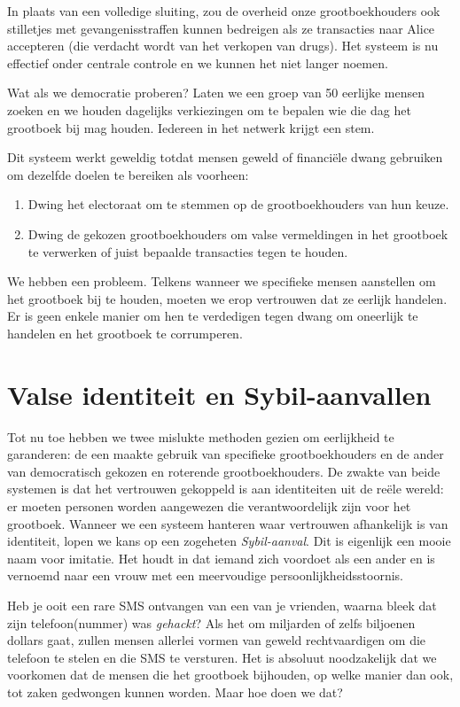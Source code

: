 \documentclass[smalldemyvopaper,11pt,twoside,onecolumn,openright,extrafontsizes]{memoir}
\begin{document}
In plaats van een volledige sluiting, zou de overheid onze grootboekhouders ook stilletjes met gevangenisstraffen kunnen bedreigen als ze transacties naar Alice accepteren (die verdacht wordt van het verkopen van drugs). Het systeem is nu effectief onder centrale controle en we kunnen het niet langer  noemen. 

Wat als we democratie proberen? Laten we een groep van 50 eerlijke mensen zoeken en we houden dagelijks verkiezingen om te bepalen wie die dag het grootboek bij mag houden. Iedereen in het netwerk krijgt een stem.

Dit systeem werkt geweldig totdat mensen geweld of financiële dwang gebruiken om dezelfde doelen te bereiken als voorheen:

\begin{enumerate}
    \item Dwing het electoraat om te stemmen op de grootboekhouders van hun keuze.
    \item Dwing de gekozen grootboekhouders om valse vermeldingen in het grootboek te verwerken of juist bepaalde transacties tegen te houden.
\end{enumerate}

We hebben een probleem. Telkens wanneer we specifieke mensen aanstellen om het grootboek bij te houden, moeten we erop vertrouwen dat ze eerlijk handelen. Er is geen enkele manier om hen te verdedigen tegen dwang om oneerlijk te handelen en het grootboek te corrumperen.

\section{Valse identiteit en Sybil-aanvallen}

Tot nu toe hebben we twee mislukte methoden gezien om eerlijkheid te garanderen: de een maakte gebruik van specifieke grootboekhouders en de ander van democratisch gekozen en roterende grootboekhouders. De zwakte van beide systemen is dat het vertrouwen gekoppeld is aan identiteiten uit de reële wereld: er moeten personen worden aangewezen die verantwoordelijk zijn voor het grootboek. Wanneer we een systeem hanteren waar vertrouwen afhankelijk is van identiteit, lopen we kans op een zogeheten \textit{Sybil-aanval}. Dit is eigenlijk een mooie naam voor imitatie. Het houdt in dat iemand zich voordoet als een ander en is vernoemd naar een vrouw met een meervoudige persoonlijkheidsstoornis.

Heb je ooit een rare SMS ontvangen van een van je vrienden, waarna bleek dat zijn telefoon(nummer) was \textit{gehackt}? Als het om miljarden of zelfs biljoenen dollars gaat, zullen mensen allerlei vormen van geweld rechtvaardigen om die telefoon te stelen en die SMS te versturen. Het is absoluut noodzakelijk dat we voorkomen dat de mensen die het grootboek bijhouden, op welke manier dan ook, tot zaken gedwongen kunnen worden. Maar hoe doen we dat?
\end{document}

